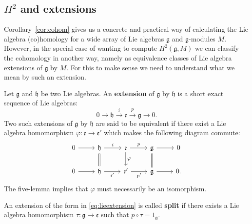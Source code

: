 \subsection{$ H^2 $ and extensions} %
\label{sub:H^2 and extensions}
Corollary~\ref{cor:cohom} gives us a concrete and practical way of calculating the Lie algebra (co)homology for a wide array of Lie algebras $ \mathfrak{g} $ and $ \mathfrak{g} $-modules $ M $. However, in the special case of wanting to compute $ H^2(\mathfrak{g}, M) $ we can classify the cohomology in another way, namely as equivalence classes of Lie algebra extensions of $ \mathfrak{g} $ by $ M $. For this to make sense we need to understand what we mean by such an extension.
\begin{definition}
  Let $ \mathfrak{g} $ and $ \mathfrak{h} $ be two Lie algebras. An \textbf{extension} of $ \mathfrak{g} $ by $ \mathfrak{h} $ is a short exact sequence of Lie algebras:
  \begin{equation}
    \label{eq:lieextension}
    0 \to \mathfrak{h} \xrightarrow{i} \mathfrak{e} \xrightarrow{p} \mathfrak{g} \to 0.
  \end{equation}
  Two such extensions of $ \mathfrak{g} $ by $ \mathfrak{h} $ are said to be equivalent if there exist a Lie algebra homomorphism $ \varphi: \mathfrak{e} \to \mathfrak{e}' $ which makes the following diagram commute:
  \[\begin{tikzcd}
	  0 & {\mathfrak{h}} & {\mathfrak{e}} & {\mathfrak{g}} & 0 \\
	  0 & {\mathfrak{h}} & {\mathfrak{e}'} & {\mathfrak{g}} & 0.
	  \arrow[Rightarrow, no head, from=1-4, to=2-4]
	  \arrow["\varphi", from=1-3, to=2-3]
	  \arrow[from=1-1, to=1-2]
	  \arrow["i", from=1-2, to=1-3]
	  \arrow["p", from=1-3, to=1-4]
	  \arrow[from=1-4, to=1-5]
	  \arrow["{i'}"', from=2-2, to=2-3]
	  \arrow["{p'}"', from=2-3, to=2-4]
	  \arrow[from=2-1, to=2-2]
	  \arrow[from=2-4, to=2-5]
	  \arrow[Rightarrow, no head, from=1-2, to=2-2]
  \end{tikzcd}\]
  The five-lemma implies that $ \varphi $ must necessarily be an isomorphism.
\end{definition}

\begin{definition}
  An extension of the form in \ref{eq:lieextension} is called \textbf{split} if there exists a Lie algebra homomorphism $ \tau: \mathfrak{g} \to \mathfrak{e} $ such that $ p \circ \tau = 1_\mathfrak{g} $.
\end{definition}

